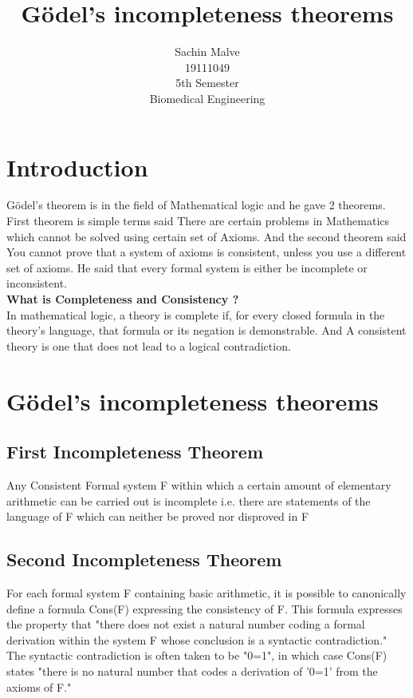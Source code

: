 \documentclass{article}
\begin{document}
\title{\vspace{-5cm}Gödel's incompleteness theorems}
\author{Sachin Malve \\
	19111049 \\
 	5th Semester \\ 
	Biomedical Engineering\\
	}
\maketitle 
 \hrulefill
\section{Introduction}
Gödel's theorem is in the field of Mathematical logic and he gave 2 theorems. First theorem is simple terms said There are certain problems in Mathematics which cannot be solved using certain set of Axioms. And the second theorem said You cannot prove that a system of axioms is consistent, unless you use a different set of axioms.
He said that every formal system is either be incomplete or inconsistent.\\
\textbf{What is Completeness and Consistency ?} \\
In mathematical logic, a theory is complete if, for every closed formula in the theory's language, that formula or its negation is demonstrable. And A consistent theory is one that does not lead to a logical contradiction.
\section{Gödel's incompleteness theorems}
\subsection{First Incompleteness Theorem  } 
Any Consistent Formal system F within which a certain amount of elementary arithmetic can be carried out is incomplete i.e. there are statements of the language of F which can neither be proved nor disproved in F
\subsection{Second Incompleteness Theorem  } 
For each formal system F containing basic arithmetic, it is possible to canonically define a formula Cons(F) expressing the consistency of F. This formula expresses the property that "there does not exist a natural number coding a formal derivation within the system F whose conclusion is a syntactic contradiction." The syntactic contradiction is often taken to be "0=1", in which case Cons(F) states "there is no natural number that codes a derivation of '0=1' from the axioms of F."   
\end{document}

